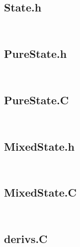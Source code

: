 \texttt{
\small
}

\subsection{State.h}

\texttt{
\small
}

\subsection{PureState.h}

\texttt{
\small
}

\subsection{PureState.C}

\texttt{
\small
}

\subsection{MixedState.h}

\texttt{
\small
}

\subsection{MixedState.C}

\texttt{
\small
}

\subsection{derivs.C}

\texttt{
\small
}

